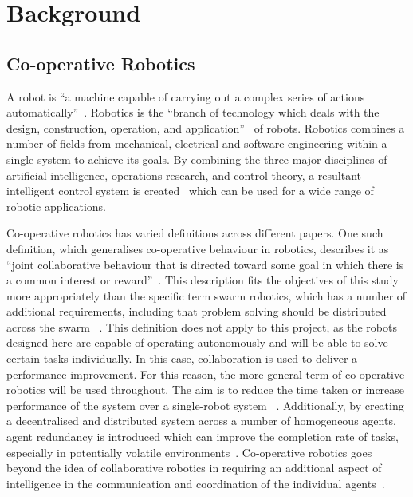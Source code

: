 
\chapter{Background}\label{litreview}

\section{Co-operative Robotics}\label{litreview/robotics}
A robot is ``a machine capable of carrying out a complex series of actions 
automatically''~\cite{robotdef}. 
Robotics is the ``branch of technology which deals with the design, construction, 
operation, and application''~\cite{roboticsdef} of robots. Robotics combines a number of fields from mechanical, 
electrical and software engineering within a single system to achieve its goals. By 
combining the three major disciplines of artificial intelligence, operations 
research, and control theory, a resultant intelligent control system is created~
\cite{saridis1983intelligent} which can be 
used for a wide range of robotic applications.

Co-operative robotics has varied definitions across different papers. One such
definition, which generalises co-operative behaviour in robotics, describes it 
as ``joint collaborative behaviour that is directed toward some goal in which 
there is a common interest or reward''~\cite{barnes1991behaviour}. This 
description fits the objectives of this study more appropriately than the 
specific term swarm robotics,  which has a number of additional requirements, 
including that problem solving should be distributed across the swarm~
\cite{sahin04}. This definition does not apply to this project, as the robots 
designed here are capable of operating autonomously and will be able to solve 
certain tasks individually. In this case, collaboration is used to deliver a 
performance improvement. For this reason, the more general term of co-operative 
robotics will be used throughout. The aim is to reduce the time taken or 
increase performance  of the system over a single-robot system~
\cite{premvuti1990consideration}. Additionally, by creating a decentralised and 
distributed system across a number of homogeneous agents, agent redundancy is 
introduced which can improve the completion rate of tasks, especially in 
potentially volatile environments~\cite{beckers1994local, parker95}.
Co-operative robotics goes beyond the idea of collaborative robotics in 
requiring an additional aspect of intelligence in the communication and 
coordination of the individual agents~\cite{cao1995cooperative}. 

